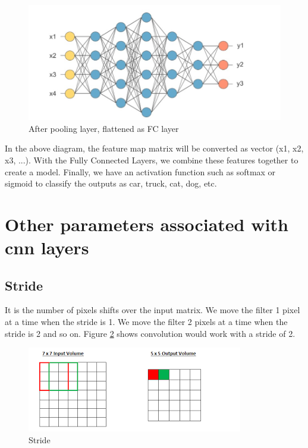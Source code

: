 \begin{figure}[H]
\centering
	\includegraphics[scale=1]{Chapter2/after_pooling_layer_flattened_as_FC_layer.jpg}	
	\caption{After pooling layer, flattened as FC layer}
	\label{fig:after_pooling}
\end{figure}

In the above diagram, the feature map matrix will be converted as vector (x1, x2, x3, ...). With the Fully Connected Layers, we combine these features together to create a model. Finally, we have an activation function such as softmax or sigmoid to classify the outputs as  car, truck, cat, dog, etc.

\section{Other parameters associated with \acrshort{cnn} layers}

\subsection{Stride} 
It is the number of pixels shifts over the input matrix. We move the filter 1 pixel at a time when the stride is 1. We move the filter 2 pixels at a time when the stride is 2 and so on. Figure \ref{fig:stride} shows convolution would work with a stride of 2.

\begin{figure}[H]
\centering
	\includegraphics[scale=1]{Chapter2/stride.png}
	\caption{Stride}
	\label{fig:stride}
\end{figure}

